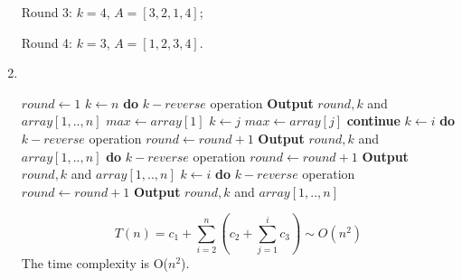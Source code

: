 \documentclass[12pt,a4paper]{article}
\makeatletter
\newtheorem*{solution}{Solution}
\theoremstyle{definition}
\renewenvironment{solution}[1][Solution] {\par\pushQED{\qed}\normalfont\topsep6\p@\@plus6\p@\relax\trivlist\item[\hskip\labelsep\bfseries#1\@addpunct{.}]\ignorespaces}{\popQED\endtrivlist\@endpefalse} \makeatother
\makeatother
\begin{document}
\begin{enumerate}
   Round 3: $k=4$, $A=[3, 2, 1, 4]$;
   
   Round 4: $k=3$, $A=[1, 2, 3, 4]$.
    \begin{solution}
        \quad \\
        \begin{algorithm}[H]
        	\BlankLine
        	\caption{$ReverseSort(array[1,..,n])$} \label{Alg-div}
        	$round \leftarrow 1$ \;
        	$k \leftarrow n$ \;
        	\textbf{do} $k-reverse$ operation\;
        	\textbf{Output} $round,k$ and $array[1,..,n]$ \;
        	{
        		$max \leftarrow array[1]$ \;
        		{
        			{
        				$k \leftarrow j$ \;
        				$max \leftarrow array[j]$ \;
        			}
        		}
        		{
        			\textbf{continue} \;
        		}
        		{
        			$k \leftarrow i$ \;
        			\textbf{do} $k-reverse$ operation\;
        			$round \leftarrow round + 1$ \;
        			\textbf{Output} $round,k$ and $array[1,..,n]$ \;
        		}
        		\Else
        		{
        			\textbf{do} $k-reverse$ operation\;
        			$round \leftarrow round + 1$ \;
        			\textbf{Output} $round,k$ and $array[1,..,n]$ \;
        			$k \leftarrow i$ \;
        			\textbf{do} $k-reverse$ operation\;
        			$round \leftarrow round + 1$ \;
        			\textbf{Output} $round,k$ and $array[1,..,n]$ \;
        		}
        	}
        	\Return{}\;       	
        \end{algorithm}
    	\[T(n) = c_1 + \sum_{i=2}^{n}(c_2+\sum_{j=1}^{i}c_3) \sim O(n^2)
    	\]
        The time complexity is O($n^2$).\\
    \end{solution}


\end{enumerate}
\end{document}
